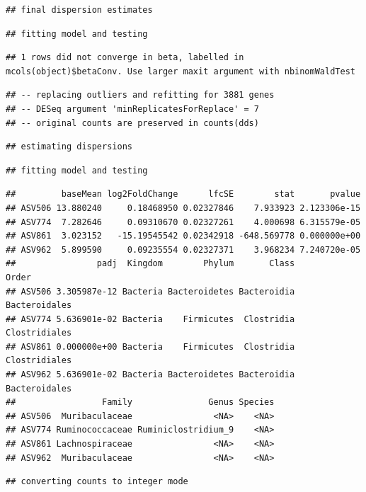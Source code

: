 \documentclass[]{article}
\begin{document}
\begin{verbatim}
## final dispersion estimates
\end{verbatim}

\begin{verbatim}
## fitting model and testing
\end{verbatim}

\begin{verbatim}
## 1 rows did not converge in beta, labelled in mcols(object)$betaConv. Use larger maxit argument with nbinomWaldTest
\end{verbatim}

\begin{verbatim}
## -- replacing outliers and refitting for 3881 genes
## -- DESeq argument 'minReplicatesForReplace' = 7 
## -- original counts are preserved in counts(dds)
\end{verbatim}

\begin{verbatim}
## estimating dispersions
\end{verbatim}

\begin{verbatim}
## fitting model and testing
\end{verbatim}

\begin{verbatim}
##         baseMean log2FoldChange      lfcSE        stat       pvalue
## ASV506 13.880240     0.18468950 0.02327846    7.933923 2.123306e-15
## ASV774  7.282646     0.09310670 0.02327261    4.000698 6.315579e-05
## ASV861  3.023152   -15.19545542 0.02342918 -648.569778 0.000000e+00
## ASV962  5.899590     0.09235554 0.02327371    3.968234 7.240720e-05
##                padj  Kingdom        Phylum       Class         Order
## ASV506 3.305987e-12 Bacteria Bacteroidetes Bacteroidia Bacteroidales
## ASV774 5.636901e-02 Bacteria    Firmicutes  Clostridia Clostridiales
## ASV861 0.000000e+00 Bacteria    Firmicutes  Clostridia Clostridiales
## ASV962 5.636901e-02 Bacteria Bacteroidetes Bacteroidia Bacteroidales
##                 Family               Genus Species
## ASV506  Muribaculaceae                <NA>    <NA>
## ASV774 Ruminococcaceae Ruminiclostridium_9    <NA>
## ASV861 Lachnospiraceae                <NA>    <NA>
## ASV962  Muribaculaceae                <NA>    <NA>
\end{verbatim}

\begin{verbatim}
## converting counts to integer mode
\end{verbatim}
\end{document}
